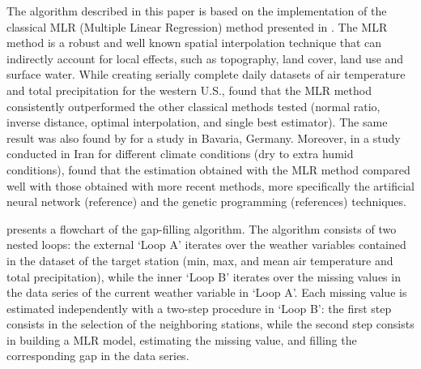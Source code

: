 \documentclass[TechnicalNoteMeteo.tex]{subfiles}
\begin{document}
The algorithm described in this paper is based on the implementation of the classical MLR (Multiple Linear Regression) method presented in \cite{eischeid_creating_2000}. The MLR method is a robust and well known spatial interpolation technique that can indirectly account for local effects, such as topography, land cover, land use and surface water. While creating serially complete daily datasets of air temperature and total precipitation for the western U.S., \cite{eischeid_creating_2000} found that the MLR method consistently outperformed the other classical methods tested (normal ratio, inverse distance, optimal interpolation, and single best estimator). The same result was also found by \cite{xia_forest_1999} for a study in Bavaria, Germany. Moreover, in a study conducted in Iran for different climate conditions (dry to extra humid conditions), \cite{kashani_evaluation_2011} found that the estimation obtained with the MLR method compared well with those obtained with more recent methods, more specifically the artificial neural network (reference) and the genetic programming (references) techniques.

 presents a flowchart of the gap-filling algorithm. The algorithm consists of two nested loops: the external `Loop A' iterates over the weather variables contained in the dataset of the target station (min, max, and mean air temperature and total precipitation), while the inner `Loop B' iterates over the missing values in the data series of the current weather variable in `Loop A'. Each missing value is estimated independently with a two-step procedure in `Loop B': the first step consists in the selection of the neighboring stations, while the second step consists in building a MLR model, estimating the missing value, and filling the corresponding gap in the data series. %
\end{document}
